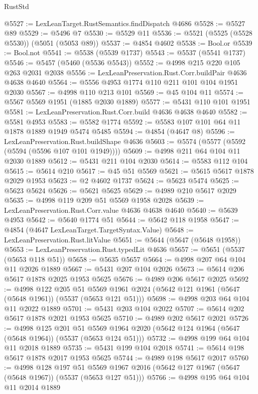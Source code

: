 \begin{lexlean}{RustStd}
\begin{coremodule}
@5527 := LexLeanTarget.RustSemantics.findDispatch @4686
@5528 := @5527 @89
@5529 := @5496 @7
@5530 := @5529 @11
@5536 := @5521 (@5525 (@5528 @5530)) (@5051 (@5053 @89))
@5537 := @4854 @4602
@5538 := Bool.or
@5539 := Bool.not
@5541 := @5538 (@5539 @1737)
@5543 := @5537 (@5541 @1737)
@5546 := @5457 (@5460 (@5536 @5543))
@5552 := @4998 @215 @220 @105 @263 @2031 @2038
@5556 := LexLeanPreservation.Rust.Corr.buildPair @4636 @4638 @4640
@5564 := @5556 @4953 @1774 @110 @211 @101 @104 @1951 @2030
@5567 := @4998 @110 @213 @101
@5569 := @45 @104 @11
@5574 := @5567 @5569 @1951 (@1885 @2030 @1889)
@5577 := @5431 @110 @101 @1951
@5581 := LexLeanPreservation.Rust.Corr.build @4636 @4638 @4640
@5582 := @5581 @4953
@5583 := @5582 @1774
@5592 := @5583 @107 @101 @64 @11 @1878 @1889 @1949 @5474 @5485
@5594 := @4854 (@4647 @8)
@5596 := LexLeanPreservation.Rust.buildShape @4636
@5603 := @5574 (@5577 (@5592 (@5594 (@5596 @107 @101 @1949))))
@5609 := @4998 @211 @64 @104 @11 @2030 @1889
@5612 := @5431 @211 @104 @2030
@5614 := @5583 @112 @104
@5615 := @5614 @210
@5617 := @45 @51 @5569
@5621 := @5615 @5617 @1878 @2029 @1953
@5623 := @2 @4602 @1737
@5624 := @5623 @5474
@5625 := @5623 @5624
@5626 := @5621 @5625
@5629 := @4989 @210 @5617 @2029
@5635 := @4998 @119 @209 @51 @5569 @1958 @2028
@5639 := LexLeanPreservation.Rust.Corr.value @4636 @4638 @4640
@5640 := @5639 @4953
@5642 := @5640 @1774 @51
@5644 := @5642 @118 @1958
@5647 := @4854 (@4647 LexLeanTarget.TargetSyntax.Value)
@5648 := LexLeanPreservation.Rust.litValue
@5651 := @5644 (@5647 (@5648 @1958))
@5653 := LexLeanPreservation.Rust.typedLit @4636
@5657 := @5651 (@5537 (@5653 @118 @51))
@5658 := @5635 @5657
@5664 := @4998 @207 @64 @104 @11 @2026 @1889
@5667 := @5431 @207 @104 @2026
@5673 := @5614 @206 @5617 @1878 @2025 @1953 @5625
@5676 := @4989 @206 @5617 @2025
@5692 := @4998
    @122
    @205
    @51
    @5569
    @1961
    @2024
    (@5642 @121 @1961 (@5647 (@5648 @1961)) (@5537 (@5653 @121 @51)))
@5698 := @4998 @203 @64 @104 @11 @2022 @1889
@5701 := @5431 @203 @104 @2022
@5707 := @5614 @202 @5617 @1878 @2021 @1953 @5625
@5710 := @4989 @202 @5617 @2021
@5726 := @4998
    @125
    @201
    @51
    @5569
    @1964
    @2020
    (@5642 @124 @1964 (@5647 (@5648 @1964)) (@5537 (@5653 @124 @51)))
@5732 := @4998 @199 @64 @104 @11 @2018 @1889
@5735 := @5431 @199 @104 @2018
@5741 := @5614 @198 @5617 @1878 @2017 @1953 @5625
@5744 := @4989 @198 @5617 @2017
@5760 := @4998
    @128
    @197
    @51
    @5569
    @1967
    @2016
    (@5642 @127 @1967 (@5647 (@5648 @1967)) (@5537 (@5653 @127 @51)))
@5766 := @4998 @195 @64 @104 @11 @2014 @1889

\end{coremodule}
\end{lexlean}
